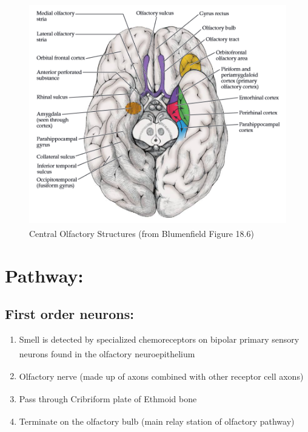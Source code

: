 \documentclass[
  letterpaper,
  DIV=11,
  numbers=noendperiod]{scrartcl}
\providecommand{\tightlist}{%
  \setlength{\itemsep}{0pt}\setlength{\parskip}{0pt}}\usepackage{longtable,booktabs,array}
\begin{document}
\begin{figure}[H]

{\centering \includegraphics{../../../../Alchemy Archive/Neuro/Neuroanatomy/Cranial Nerves/images/fig18.6 central olfactory structures blumenfeldNeuroanatomyClinicalCases2022.png}

}

\caption{Central Olfactory Structures (from Blumenfield Figure
18.6\textsuperscript{})}

\end{figure}%

\section{Pathway:}\label{pathway}

\subsection{First order neurons:}\label{first-order-neurons}

\begin{enumerate}
\def\labelenumi{\arabic{enumi}.}
\tightlist
\item
  Smell is detected by specialized chemoreceptors on bipolar primary
  sensory neurons found in the olfactory
  neuroepithelium\textsuperscript{}
\item
  Olfactory nerve (made up of axons combined with other receptor cell
  axons)\textsuperscript{}
\item
  Pass through Cribriform plate of Ethmoid
  bone\textsuperscript{}
\item
  Terminate on the olfactory bulb (main relay station of olfactory
  pathway)\textsuperscript{}
\end{enumerate}
\end{document}
